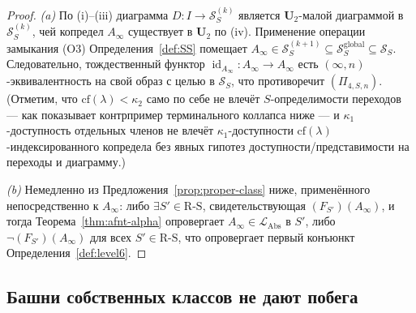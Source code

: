 \documentclass[11pt]{article}
\theoremstyle{plain}
\theoremstyle{definition}
\newcommand{\RS}{\mathrm{R\text{-}S}}
\newcommand{\cS}{\mathcal{S}}
\newcommand{\LAbs}{\mathcal{L}_{\mathrm{Abs}}}
\DeclareMathOperator{\id}{id}
\begin{document}
\begin{proof}
\emph{(a)} По (i)--(iii) диаграмма $D : I \to \cS_S^{(k)}$ является $\mathbf{U}_2$-малой диаграммой в $\cS_S^{(k)}$, чей копредел $A_\infty$ существует в $\mathbf{U}_2$ по (iv). Применение операции замыкания (O3) Определения~\ref{def:SS} помещает $A_\infty \in \cS_S^{(k+1)} \subseteq \cS_S^{\mathrm{global}} \subseteq \cS_S$. Следовательно, тождественный функтор $\id_{A_\infty} : A_\infty \to A_\infty$ есть $(\infty, n)$-эквивалентность на свой образ с целью в $\cS_S$, что противоречит $(\Pi_{4, S, n})$. (Отметим, что $\mathrm{cf}(\lambda) < \kappa_2$ само по себе не влечёт $S$-определимости переходов --- как показывает контрпример терминального коллапса ниже --- и $\kappa_1$-доступность отдельных членов не влечёт $\kappa_1$-доступности $\mathrm{cf}(\lambda)$-индексированного копредела без явных гипотез доступности/представимости на переходы и диаграмму.)

\emph{(b)} Немедленно из Предложения~\ref{prop:proper-class} ниже, применённого непосредственно к $A_\infty$: либо $\exists S' \in \RS$, свидетельствующая $(F_{S'})(A_\infty)$, и тогда Теорема~\ref{thm:afnt-alpha} опровергает $A_\infty \in \LAbs$ в $S'$, либо $\neg(F_{S'})(A_\infty)$ для всех $S' \in \RS$, что опровергает первый конъюнкт Определения~\ref{def:level6}.
\end{proof}

\subsection{Башни собственных классов не дают побега}
\end{document}
